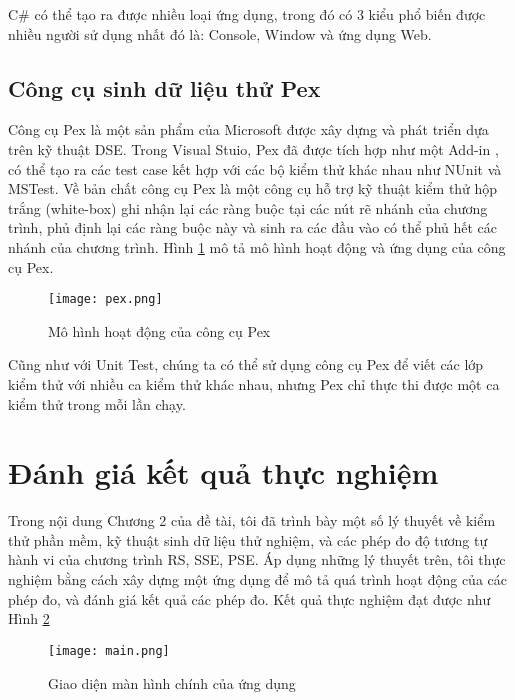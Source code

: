 C\# có thể tạo ra được nhiều loại ứng dụng, trong đó có 3 kiểu phổ biến được 
nhiều người sử dụng nhất đó là: Console, Window và ứng dụng Web. 

\subsection{Công cụ sinh dữ liệu thử Pex}
Công cụ Pex là một sản phẩm của Microsoft được xây dựng và phát 
triển dựa trên kỹ thuật DSE. Trong Visual Stuio, Pex đã được tích hợp 
như một Add-in \cite{tillmann2014transferring}, có thể tạo ra các test case kết hợp với các bộ kiểm 
thử khác nhau như NUnit và MSTest. Về bản chất công cụ Pex là một công cụ hỗ trợ 
kỹ thuật kiểm thử hộp trắng (white-box) ghi nhận lại các ràng buộc tại các nút 
rẽ nhánh của chương trình, phủ định lại các ràng buộc này và sinh ra các đầu 
vào có thể phủ hết các nhánh của chương trình. Hình \ref{fig:ModelPex}\cite{tillmann2013teaching} mô tả 
mô hình hoạt động và ứng dụng của công cụ Pex.

\begin{figure}[H]	
	\begin{center}
		\texttt{[image: pex.png]}
	\end{center}
	\caption{Mô hình hoạt động của công cụ Pex}
	\label{fig:ModelPex}	
\end{figure}

Cũng như với Unit Test, chúng ta có thể sử dụng công cụ Pex để viết 
các lớp kiểm thử với nhiều ca kiểm thử khác nhau, nhưng Pex chỉ 
thực thi được một ca kiểm thử trong mỗi lần chạy.

\section{Đánh giá kết quả thực nghiệm}

Trong nội dung Chương 2 của đề tài, tôi đã trình bày một số lý thuyết về kiểm
thử phần mềm, kỹ thuật sinh dữ liệu thử nghiệm, và các phép đo
độ tương tự hành vi của chương trình RS, SSE, PSE. Áp dụng những
lý thuyết trên, tôi thực nghiệm bằng cách xây dựng một ứng dụng để mô tả
quá trình hoạt động của các phép đo, và đánh giá kết quả các phép đo. 
Kết quả thực nghiệm đạt được như Hình \ref{fig:frmMain}

\begin{figure}[H]	
	\begin{center}
	 \texttt{[image: main.png]}
	\end{center}
	\caption{Giao diện màn hình chính của ứng dụng}
	\label{fig:frmMain}
\end{figure}

